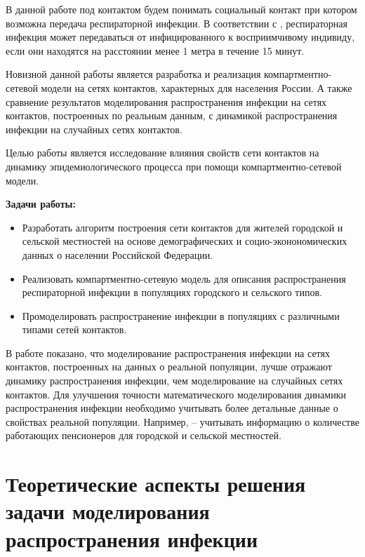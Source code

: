 \documentclass[14pt,a4paper]{article}
\begin{document}
В данной работе под контактом будем понимать социальный контакт при котором возможна передача респираторной инфекции. В соответствии с \cite{voz}, респираторная инфекция может передаваться от инфицированного к восприимчивому индивиду, если они находятся на расстоянии менее 1 метра в течение 15 минут.

Новизной данной работы является разработка и реализация компартментно-сетевой модели на сетях контактов, характерных для населения России. А также сравнение результатов моделирования распространения инфекции на сетях контактов, построенных по реальным данным, с динамикой распространения инфекции на случайных сетях контактов.


Целью работы является исследование влияния свойств сети контактов на динамику эпидемиологического
процесса при помощи компартментно-сетевой модели.

  
\textbf{Задачи работы:}
\begin{itemize}
	\item Разработать алгоритм построения сети контактов для жителей городской и сельской местностей на основе демографических и социо-эконономических данных о населении Российской Федерации.
	
	\item  Реализовать компартментно-сетевую модель для описания распространения респираторной инфекции в популяциях городского и сельского типов.
	
	\item Промоделировать распространение инфекции в популяциях с различными типами сетей контактов.
	
\end{itemize}


В работе показано, что моделирование распространения инфекции на сетях контактов, построенных на данных о реальной популяции, лучше отражают динамику распространения инфекции, чем моделирование на случайных сетях контактов. 
Для улучшения точности математического моделирования динамики распространения инфекции необходимо учитывать более детальные данные о свойствах реальной популяции. Например, -- учитывать информацию о количестве работающих пенсионеров для городской и сельской местностей.


\newpage

\section{Теоретические аспекты решения задачи моделирования распространения инфекции}
\end{document}
